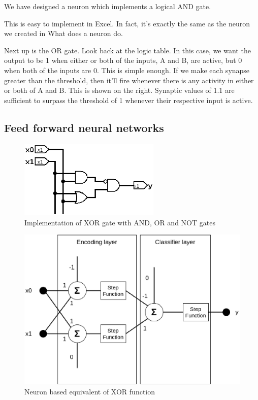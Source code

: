 We have designed a neuron which implements a logical AND gate.  

This is easy to implement in Excel.  In fact, it's exactly the same as the neuron we 
created in What does a neuron do.  

Next up is the OR gate.  Look back at the logic table.  In this case, we want the output to 
be 1 when either or both of the inputs, A and B, are active, but 0 when both of the inputs are 0.  
This is simple enough.  If we make each synapse greater than the threshold, 
then it'll fire whenever there is any activity in either or both of A and B.
This is shown on the right.  Synaptic values of 1.1 are sufficient to surpass 
the threshold of 1 whenever their respective input is active.  
	

\subsection{Feed forward neural networks}

\begin{figure}[htb] 
	\label{fig:xor_gates}
	\centering
	\includegraphics[width=0.6\textwidth]{figures/xor_gates}
	\caption{Implementation of XOR gate with AND, OR and NOT gates}
\end{figure}

\begin{figure}[htb] 
	\label{fig:neuro_xor}
	\centering
	\includegraphics[width=\textwidth]{figures/neuro_xor}
	\caption{Neuron based equivalent of XOR function}
\end{figure}

